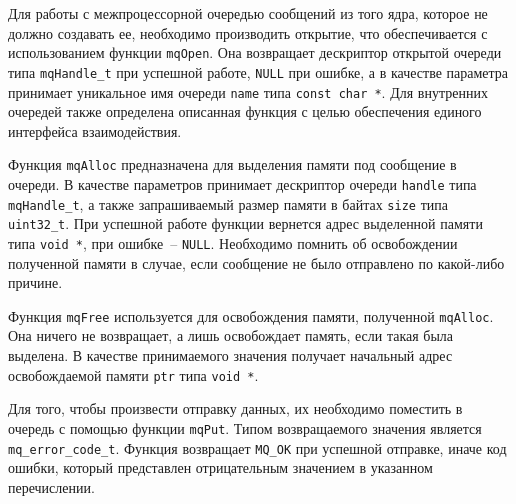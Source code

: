 Для работы с межпроцессорной очередью сообщений из того ядра, которое
не должно создавать ее, необходимо производить открытие, что обеспечивается с использованием функции \lstinline{mqOpen}. Она возвращает дескриптор открытой
очереди типа \lstinline{mqHandle_t} при успешной работе, \lstinline{NULL} при ошибке, а в качестве параметра принимает уникальное имя очереди \lstinline{name} типа
\lstinline{const char *}.
Для внутренних очередей также определена описанная функция с целью обеспечения
единого интерфейса взаимодействия.

Функция \lstinline{mqAlloc} предназначена для выделения памяти под сообщение в очереди. В качестве параметров принимает дескриптор очереди \lstinline{handle} типа \lstinline{mqHandle_t},
а также запрашиваемый размер памяти в байтах \lstinline{size} типа \lstinline{uint32_t}. При успешной работе функции вернется адрес выделенной памяти типа \lstinline{void *},
при ошибке~-- \lstinline{NULL}. Необходимо помнить об освобождении полученной памяти в случае, если сообщение не было отправлено по какой-либо причине.

Функция \lstinline{mqFree} используется для освобождения памяти, полученной \lstinline{mqAlloc}. Она ничего не возвращает, а лишь освобождает память, если такая была выделена.
В качестве принимаемого значения получает начальный адрес освобождаемой памяти \lstinline{ptr} типа \lstinline{void *}.

Для того, чтобы произвести отправку данных, их необходимо поместить в очередь с помощью функции \lstinline{mqPut}. Типом возвращаемого значения является \lstinline{mq_error_code_t}. Функция возвращает \lstinline{MQ_OK} при успешной отправке, иначе код ошибки, который представлен отрицательным значением в указанном перечислении.

